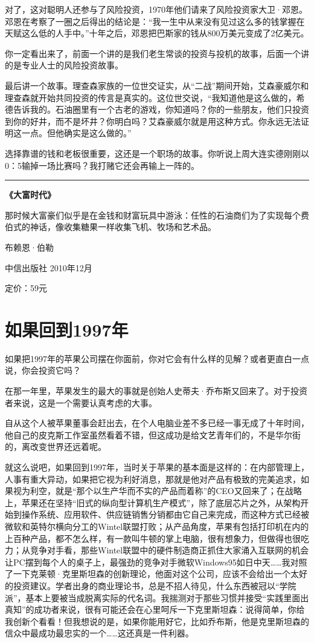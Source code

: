 对了，这对聪明人还参与了风险投资，1970年他们请来了风险投资家大卫·邓恩。邓恩在考察了一圈之后得出的结论是：``我一生中从来没有见过这么多的钱掌握在天赋这么低的人手中。''十年之后，邓恩把巴斯家的钱从800万美元变成了2亿美元。

你一定看出来了，前面一个讲的是我们老生常谈的投资与投机的故事，后面一个讲的是专业人士的风险投资故事。

最后讲一个故事。理查森家族的一位世交证实，从``二战''期间开始，艾森豪威尔和理查森就开始共同投资的传言是真实的。这位世交说，``我知道他是这么做的，希德告诉我的。石油圈里有一个古老的游戏，你知道吗？你的一些朋友，他们只投资到你的好井，而不是坏井？你明白吗？艾森豪威尔就是用这种方式。你永远无法证明这一点。但他确实是这么做的。''

选择靠谱的钱和老板很重要，这还是一个职场的故事。你听说上周大连实德刚刚以0：5输掉一场比赛吗？我打赌它还会再输上一阵的。

\begin{center}\rule{3in}{0.4pt}\end{center}

\textbf{《大富时代》}

那时候大富豪们似乎是在金钱和财富玩具中游泳：任性的石油商们为了实现每个费伯式的神话，像收集糖果一样收集飞机、牧场和艺术品。

布赖恩·伯勒

中信出版社 2010年12月

定价：59元

\section{如果回到1997年}

如果把1997年的苹果公司摆在你面前，你对它会有什么样的见解？或者更直白一点说，你会投资它吗？

在那一年里，苹果发生的最大的事就是创始人史蒂夫·乔布斯又回来了。对于投资者来说，这是一个需要认真考虑的大事。

自从这个人被苹果董事会赶出去，在个人电脑业差不多已经一事无成了十年时间，他自己的皮克斯工作室虽然看着不错，但这成功是给文艺青年们的，不是华尔街的，离改变世界还远着呢。

就这么说吧，如果回到1997年，当时关于苹果的基本面是这样的：在内部管理上，人事有重大异动，如果把它视为利好消息，那就是他对产品有极致的完美追求，如果视为利空，就是``那个以生产华而不实的产品而着称''的CEO又回来了；在战略上，苹果还在坚持``旧式的纵向型计算机生产模式''，除了底层芯片之外，从架构开始到操作系统、应用软件、供应链销售分销都由它自己来完成，而这种方式已经被微软和英特尔横向分工的Wintel联盟打败；从产品角度，苹果有包括打印机在内的上百种产品，都不怎么样，有一款叫牛顿的掌上电脑，很有想象力，但做得也很吃力；从竞争对手看，那些Wintel联盟中的硬件制造商正抓住大家涌入互联网的机会让PC摆到每个人的桌子上，最强劲的竞争对手微软Windows95如日中天\ldots{}\ldots{}我对照了一下克莱顿·克里斯坦森的创新理论，他面对这个公司，应该不会给出一个太好的投资建议。学者出身的商业理论书，总是不招人待见，什么东西被冠以``学院派''，基本上要被当成脱离实际的代名词。我揣测对于那些习惯并接受``实践里面出真知''的成功者来说，很有可能还会在心里呵斥一下克里斯坦森：说得简单，你给我创新个看看！但我想说的是，如果你能用好它，比如乔布斯，他是克里斯坦森的信众中最成功最忠实的一个\ldots{}\ldots{}这还真是一件利器。

